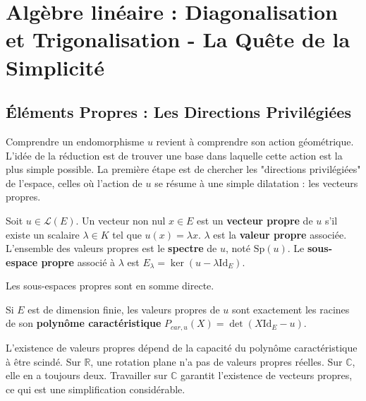 \chapter{Algèbre linéaire : Diagonalisation et Trigonalisation - La Quête de la Simplicité}

\section{Éléments Propres : Les Directions Privilégiées}

\begin{objectif}
    Comprendre un endomorphisme $u$ revient à comprendre son action géométrique. L'idée de la réduction est de trouver une base dans laquelle cette action est la plus simple possible. La première étape est de chercher les "directions privilégiées" de l'espace, celles où l'action de $u$ se résume à une simple dilatation : les vecteurs propres.
\end{objectif}

\begin{definition}
    Soit $u \in \mathcal{L}(E)$. Un vecteur non nul $x \in E$ est un \textbf{vecteur propre} de $u$ s'il existe un scalaire $\lambda \in K$ tel que $u(x) = \lambda x$.
    $\lambda$ est la \textbf{valeur propre} associée. L'ensemble des valeurs propres est le \textbf{spectre} de $u$, noté $\mathrm{Sp}(u)$.
    Le \textbf{sous-espace propre} associé à $\lambda$ est $E_\lambda = \ker(u - \lambda \mathrm{Id}_E)$.
\end{definition}

\begin{proposition}
    Les sous-espaces propres sont en somme directe.
\end{proposition}

\begin{definition}
    Si $E$ est de dimension finie, les valeurs propres de $u$ sont exactement les racines de son \textbf{polynôme caractéristique} $P_{car,u}(X) = \det(X \mathrm{Id}_E - u)$.
\end{definition}
\begin{remark}
    L'existence de valeurs propres dépend de la capacité du polynôme caractéristique à être scindé. Sur $\mathbb{R}$, une rotation plane n'a pas de valeurs propres réelles. Sur $\mathbb{C}$, elle en a toujours deux. Travailler sur $\mathbb{C}$ garantit l'existence de vecteurs propres, ce qui est une simplification considérable.
\end{remark}

